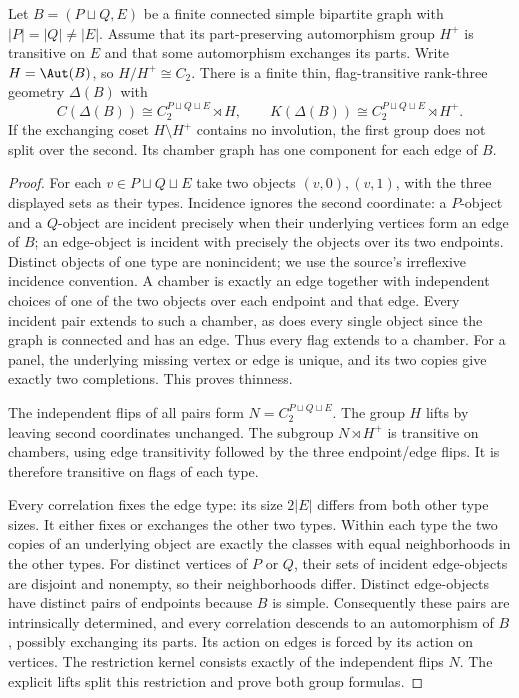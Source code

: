 \begin{proposition}\label{UR.ThinDoubling}
Let $B=(P\sqcup Q,E)$ be a finite connected simple bipartite graph with
$|P|=|Q|\ne|E|$. Assume that its part-preserving automorphism group
$H^+$ is transitive on $E$ and that some automorphism exchanges its parts.
Write $H=\Aut(B)$, so $H/H^+\cong C_2$. There is a finite thin,
flag-transitive rank-three geometry $\Delta(B)$ with
\[
 C(\Delta(B))\cong C_2^{P\sqcup Q\sqcup E}\rtimes H,
 \qquad
 K(\Delta(B))\cong C_2^{P\sqcup Q\sqcup E}\rtimes H^+.
\]
If the exchanging coset $H\setminus H^+$ contains no involution, the
first group does not split over the second. Its chamber graph has one
component for each edge of $B$.
\end{proposition}
\begin{proof}
For each $v\in P\sqcup Q\sqcup E$ take two objects $(v,0),(v,1)$,
with the three displayed sets as their types. Incidence ignores the
second coordinate: a $P$-object and a $Q$-object are incident precisely
when their underlying vertices form an edge of $B$; an edge-object is
incident with precisely the objects over its two endpoints. Distinct objects of one type are nonincident; we use the source's
irreflexive incidence convention.
A chamber is exactly an edge together with independent choices of one
of the two objects over each endpoint and that edge. Every incident
pair extends to such a chamber, as does every single object since the
graph is connected and has an edge. Thus every flag extends to a
chamber. For a panel, the underlying missing vertex or edge is unique,
and its two copies give exactly two completions. This proves thinness.

The independent flips of all pairs form
$N=C_2^{P\sqcup Q\sqcup E}$. The group $H$ lifts by leaving second
coordinates unchanged. The subgroup $N\rtimes H^+$ is transitive on
chambers, using edge transitivity followed by the three endpoint/edge
flips. It is therefore transitive on flags of each type.

Every correlation fixes the edge type: its size $2|E|$ differs from
both other type sizes. It either fixes or exchanges the other two
types. Within each type the two copies of an underlying object are
exactly the classes with equal neighborhoods in the other types.
For distinct vertices of $P$ or $Q$, their sets of incident edge-objects
are disjoint and nonempty, so their neighborhoods differ. Distinct
edge-objects have distinct pairs of endpoints because $B$ is simple.
Consequently these pairs are intrinsically determined, and every
correlation descends to an automorphism of $B$, possibly exchanging
its parts. Its action on edges is forced by its action on vertices.
The restriction kernel consists exactly of the independent flips $N$.
The explicit lifts split this restriction and prove both group formulas.


\end{proof}

